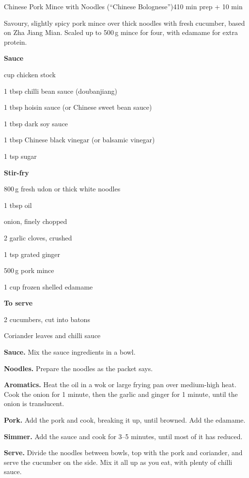 \begin{recipebox}{Chinese Pork Mince with Noodles (``Chinese Bolognese'')}{4}{10 min prep + 10 min}

Savoury, slightly spicy pork mince over thick noodles with fresh cucumber, based
on Zha Jiang Mian. Scaled up to 500\,g mince for four, with edamame for extra
protein.

\begin{ingredients}
  \item[] \textbf{Sauce}
  \item {} cup chicken stock
  \item 1 tbsp chilli bean sauce (doubanjiang)
  \item 1 tbsp hoisin sauce (or Chinese sweet bean sauce)
  \item 1 tbsp dark soy sauce
  \item 1 tbsp Chinese black vinegar (or balsamic vinegar)
  \item 1 tsp sugar
  \item[] \textbf{Stir-fry}
  \item 800\,g fresh udon or thick white noodles
  \item 1 tbsp oil
  \item {} onion, finely chopped
  \item 2 garlic cloves, crushed
  \item 1 tsp grated ginger
  \item 500\,g pork mince
  \item 1 cup frozen shelled edamame
  \item[] \textbf{To serve}
  \item 2 cucumbers, cut into batons
  \item Coriander leaves and chilli sauce
\end{ingredients}

\begin{method}
  \item \textbf{Sauce.} Mix the sauce ingredients in a bowl.
  \item \textbf{Noodles.} Prepare the noodles as the packet says.
  \item \textbf{Aromatics.} Heat the oil in a wok or large frying pan over
        medium-high heat. Cook the onion for 1 minute, then the garlic and ginger
        for 1 minute, until the onion is translucent.
  \item \textbf{Pork.} Add the pork and cook, breaking it up, until browned. Add the
        edamame.
  \item \textbf{Simmer.} Add the sauce and cook for 3--5 minutes, until most of it
        has reduced.
  \item \textbf{Serve.} Divide the noodles between bowls, top with the pork and
        coriander, and serve the cucumber on the side. Mix it all up as you eat,
        with plenty of chilli sauce.
\end{method}


\end{recipebox}
